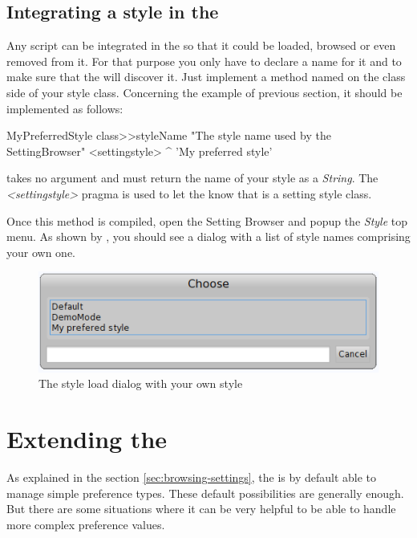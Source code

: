 \documentclass[a4paper,10pt,twoside]{book}
\begin{document}
{\subsection{Integrating a style in the \setbrowser}
Any script can be integrated in the \setbrowser so that it could be loaded, browsed or even removed from it. For that purpose you only have to declare a name for it and to make sure that the \setbrowser will discover it. Just implement a method named  on the class side of your style class. Concerning the example of previous section, it should be implemented as follows:

\begin{code}{}
MyPreferredStyle class>>styleName
	"The style name used by the SettingBrowser"
	<settingstyle>
	^ 'My preferred style'
\end{code}

 takes no argument and must return the name of your style as a \textit{String}. The \textit{<settingstyle>} pragma is used to let the \setbrowser know that  is a setting style class.

Once this method is compiled, open the Setting Browser and popup the \textit{Style} top menu. As shown by , you should see a dialog with a list of style names comprising your own one.

\begin{figure}[tbh]
\begin{center}
\includegraphics[scale=0.4]{setting-style-load-dialog}
\caption{The style load dialog with your own style}
\end{center}
\end{figure}


\section{Extending the \setbrowser}
\label{sec:ExtendingTheSettingsBrowser}
As explained in the section \ref{sec:browsing-settings}, the \setbrowser is by default able to manage simple preference types. These default possibilities are generally enough. But there are some situations where it can be very helpful to be able to handle more complex preference values. 

}
\end{document}
